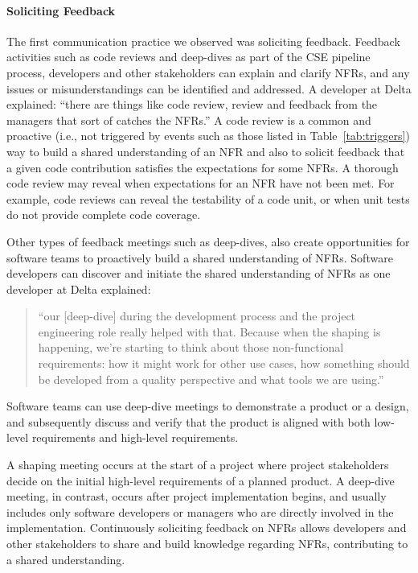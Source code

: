 \documentclass[smallextended]{svjour3}
\begin{document}
\paragraph{Soliciting Feedback} The first communication practice we observed was soliciting feedback. Feedback activities such as code reviews and deep-dives as part of the CSE pipeline process, developers and other stakeholders can explain and clarify NFRs, and any issues or misunderstandings can be identified and addressed. A developer at Delta explained: 
\textmd{``there are things like code review, review and feedback from the managers that sort of catches the NFRs.''}
A code review is a common and proactive (i.e., not triggered by events such as those listed in Table~\ref{tab:triggers}) way to build a shared understanding of an NFR and also to solicit feedback that a given code contribution satisfies the expectations for some NFRs.
A thorough code review may reveal when 
expectations for an NFR have not been met. For example, code reviews can reveal the testability of a code unit, or when unit tests do not provide complete code coverage. 

Other types of feedback meetings such as deep-dives, also create opportunities for software teams to proactively build a shared understanding of NFRs.
Software developers can discover and initiate the shared understanding of NFRs as one developer at Delta explained: 
\begin{quote}
    ``our [deep-dive] during the development process and the project engineering role really helped with that. Because when the shaping is happening, we're starting to think about those non-functional requirements: how it might work for other use cases, how something should be developed from a quality perspective and what tools we are using.''    
\end{quote}
Software teams can use deep-dive meetings to demonstrate a product or a design, and subsequently discuss and verify that the product is aligned with both low-level requirements and high-level requirements.

A shaping meeting occurs at the start of a project where project stakeholders decide on the initial high-level requirements of a planned product. A deep-dive meeting, in contrast, occurs after project implementation begins, and usually includes only software developers or managers who are directly involved in the implementation. 
Continuously soliciting feedback on NFRs allows developers and other stakeholders to share and build knowledge regarding NFRs, contributing to a shared understanding.
\end{document}
